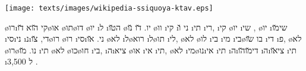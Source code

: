 \texttt{[image: texts/images/wikipedia-ssiquoya-ktav.eps]}

 \o{רו}\i{קי} \u{הוא}  \u{דו}\o{או} \o{תו}\o{דו} \o{יו} \i{ל}  \i{ה}\u{טו} \o{יו}. \u{דו} \u{נו} \o{וו} \i{קי} \i{ני} \u{ו} \i{תי} \i{רי},  \i{קי}  \o{יו}  \i{שי} ,  \o{יו}  \i{שי}\u{מו} \i{סי}\i{ני} \i{נ}\i{די},  \u{צו}\o{רו}   \o{רו} \i{סי}\i{ני}. \u{או}  \o{לא}  \i{ל}\o{רוא} \i{ל}\o{תו} \i{לי}, \o{לא}  \o{לו} \i{בי} \i{מי}  \i{בי}\o{בו} \u{שו} \i{די}  \i{פ},  \o{לא}  \o{רו}\o{נו}.   \u{מו} \i{תי} \o{לא}  \o{כו}\o{חו} \i{בי},  \i{ה}\i{ציא} \o{או} \i{אי}  \i{תי}, \o{לא}  \i{מי}\o{נו}\i{אי}  \i{תי} \i{ה}\i{די}\u{מו}\u{הו} \i{ה}\i{צי}\u{או}  \i{תי}  \i{ל} 3,500 .

